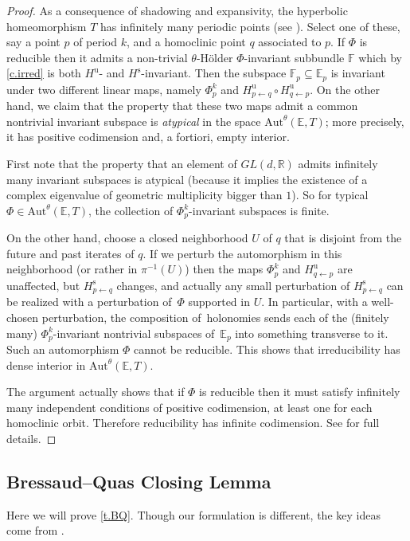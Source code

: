 \documentclass[JEP,XML,SOM,Unicode]{cedram}
\theoremstyle{plain}
\theoremstyle{definition}
\newcommand{\RR}{\mathbb{R}}
\newcommand{\EE}{\mathbb{E}}
\newcommand{\FF}{\mathbb{F}}
\newcommand{\GL}{\mathit{GL}}
\newcommand{\uu}{\mathrm{u}}
\renewcommand{\ss}{\mathrm{s}}
\newcommand{\Aut}{\mathrm{Aut}}
\begin{document}
\begin{proof}
As a consequence of shadowing and expansivity, the hyperbolic homeomorphism $T$ has infinitely many periodic points (see \eg \cite[p.\,228]{Akin}). Select one of these, say a point $p$ of period $k$, and a homoclinic point $q$ associated to $p$. If $\Phi$ is reducible then it admits a non-trivial $\theta$-Hölder $\Phi$-invariant subbundle $\FF$ which by \cref{c.irred} is both $H^\uu$- and $H^\ss$-invariant.
Then the subspace $\FF_p \subseteq \EE_p$ is invariant under two different linear maps, namely
$\Phi^k_p$ and $H^\uu_{p \gets q} \circ H^\uu_{q \gets p}$.
On the other hand, we claim that the property that these two maps admit a common nontrivial invariant subspace is \emph{atypical} in the space $\Aut^\theta(\EE,T)$; more precisely, it has positive codimension and, a fortiori, empty interior.

First note that the property that an element of $\GL(d,\RR)$ admits infinitely many invariant subspaces is atypical (because it implies the existence of a complex eigenvalue of geometric multiplicity bigger than $1$). So for typical $\Phi \in \Aut^\theta(\EE,T)$, the collection of $\Phi^k_p$-invariant subspaces is finite.

On the other hand, choose a closed neighborhood $U$ of $q$ that is disjoint from the future and past iterates of $q$.
If we perturb the automorphism in this neighborhood (or rather in $\pi^{-1}(U)$) then the maps $\Phi^k_p$ and $H^\uu_{q \gets p}$ are unaffected, but $H^\ss_{p \gets q}$ changes, and actually any small perturbation of $H^\ss_{p \gets q}$ can be realized with a perturbation of~$\Phi$ supported in $U$.
In particular, with a well-chosen perturbation, the composition of~holonomies sends each of the (finitely many) $\Phi^k_p$-invariant nontrivial subspaces of~$\EE_p$ into something transverse to it. Such an automorphism $\Phi$ cannot be reducible.
This shows that irreducibility has dense interior in $\Aut^\theta(\EE,T)$.

The argument actually shows that if $\Phi$ is reducible then it must satisfy infinitely many independent conditions of positive codimension, at least one for each homoclinic orbit.
Therefore reducibility has infinite codimension. See \cite[\S4]{Viana} for full details.
\end{proof}

\subsection{Bressaud--Quas Closing Lemma}\label{ss.BQ}
Here we will prove \cref{t.BQ}.
Though our formulation is different, the key ideas come from \cite{BQuas}.
\end{document}
